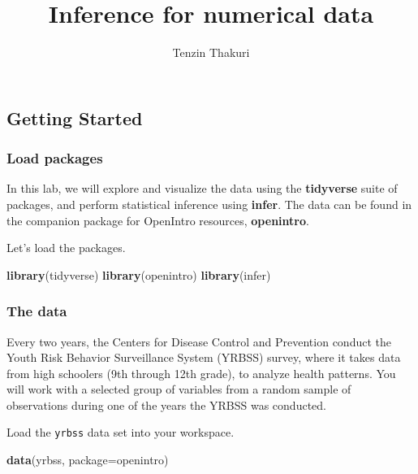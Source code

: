 \documentclass[
]{article}
\title{Inference for numerical data}
\author{Tenzin Thakuri}
\date{}
\newenvironment{Shaded}{\begin{snugshade}}{\end{snugshade}}
\newcommand{\AttributeTok}[1]{\textcolor[rgb]{0.13,0.29,0.53}{#1}}
\newcommand{\FunctionTok}[1]{\textcolor[rgb]{0.13,0.29,0.53}{\textbf{#1}}}
\newcommand{\NormalTok}[1]{#1}
\newcommand{\StringTok}[1]{\textcolor[rgb]{0.31,0.60,0.02}{#1}}
\begin{document}
\maketitle

\subsection{Getting Started}\label{getting-started}

\subsubsection{Load packages}\label{load-packages}

In this lab, we will explore and visualize the data using the
\textbf{tidyverse} suite of packages, and perform statistical inference
using \textbf{infer}. The data can be found in the companion package for
OpenIntro resources, \textbf{openintro}.

Let's load the packages.

\begin{Shaded}
\begin{Highlighting}[]
\FunctionTok{library}\NormalTok{(tidyverse)}
\FunctionTok{library}\NormalTok{(openintro)}
\FunctionTok{library}\NormalTok{(infer)}
\end{Highlighting}
\end{Shaded}

\subsubsection{The data}\label{the-data}

Every two years, the Centers for Disease Control and Prevention conduct
the Youth Risk Behavior Surveillance System (YRBSS) survey, where it
takes data from high schoolers (9th through 12th grade), to analyze
health patterns. You will work with a selected group of variables from a
random sample of observations during one of the years the YRBSS was
conducted.

Load the \texttt{yrbss} data set into your workspace.

\begin{Shaded}
\begin{Highlighting}[]
\FunctionTok{data}\NormalTok{(}\StringTok{\textquotesingle{}yrbss\textquotesingle{}}\NormalTok{, }\AttributeTok{package=}\StringTok{\textquotesingle{}openintro\textquotesingle{}}\NormalTok{)}
\end{Highlighting}
\end{Shaded}
\end{document}
